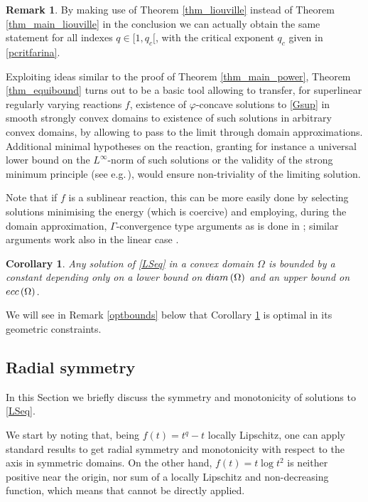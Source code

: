 \documentclass[12pt]{amsart}
\numberwithin{equation}{section}
\theoremstyle{plain}
\theoremstyle{plain}
\theoremstyle{plain}
\newtheorem{corollary}[theorem]{Corollary}
\theoremstyle{definition}
\newtheorem{remark}[theorem]{Remark}
\begin{document}
\begin{remark}
By making use of Theorem \ref{thm_liouville} instead of Theorem \ref{thm_main_liouville} in the conclusion we can actually obtain the same statement for all indexes $q\in [1, q_c[$, with the critical exponent $q_c$ given in \eqref{pcritfarina}.
 
Exploiting ideas similar to the proof of Theorem \ref{thm_main_power}, Theorem \ref{thm_equibound} turns out to be a basic tool allowing to transfer, for superlinear regularly varying reactions $f$, existence of $\varphi$-concave solutions to \eqref{Gsup} in smooth strongly convex domains to existence of such solutions in arbitrary convex domains, by allowing to pass to the limit through domain approximations.
Additional minimal hypotheses on the reaction, granting for instance a universal lower bound on the $L^\infty$-norm of such solutions or the validity of the strong minimum principle (see e.g.$\,$\cite[Theorem 1.1.1]{PuSe07}), would ensure non-triviality of the limiting solution. 

Note that if $f$ is a sublinear reaction, this can be more easily done by selecting solutions minimising the energy (which is coercive) and employing, during the domain approximation, $\Gamma$-convergence type arguments as is done in \cite{BMS22, MRS24}; similar arguments work also in the linear case \cite[Section 5.1.1]{GaSq25}.
\end{remark}

\begin{corollary}
\label{corlinfb}
Any solution of \eqref{LSeq} in a convex domain $\Omega$ is bounded by a constant depending only on a lower bound on ${\rm diam}\, (\Omega)$ and an upper bound on ${\rm ecc}\, (\Omega)$.
\end{corollary}

We will see in Remark \ref{optbounds} below that Corollary \ref{corlinfb} is optimal in its geometric constraints.


\subsection{Radial symmetry} 
\label{sec_radial_sym}

In this Section we briefly discuss the symmetry and monotonicity of solutions to \eqref{LSeq}.

We start by noting that, being $f(t)= t^q-t$ locally Lipschitz, one can apply standard results to get radial symmetry and monotonicity with respect to the axis in symmetric domains. 
On the other hand, $f(t)= t \log t^2$ is neither positive near the origin, nor sum of a locally Lipschitz and non-decreasing function, which means that \cite{GNN79} cannot be directly applied.
\end{document}
